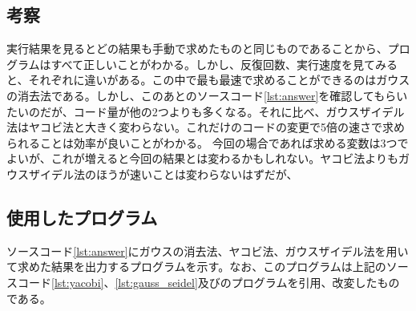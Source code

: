 \documentclass[12pt]{jsarticle}
\begin{document}
\subsection{考察}
実行結果を見るとどの結果も手動で求めたものと同じものであることから、プログラムはすべて正しいことがわかる。しかし、反復回数、実行速度を見てみると、それぞれに違いがある。この中で最も最速で求めることができるのはガウスの消去法である。しかし、このあとのソースコード\ref{lst:answer}を確認してもらいたいのだが、コード量が他の2つよりも多くなる。それに比べ、ガウスザイデル法はヤコビ法と大きく変わらない。これだけのコードの変更で5倍の速さで求められることは効率が良いことがわかる。
今回の場合であれば求める変数は3つでよいが、これが増えると今回の結果とは変わるかもしれない。ヤコビ法よりもガウスザイデル法のほうが速いことは変わらないはずだが、

\subsection{使用したプログラム}

ソースコード\ref{lst:answer}にガウスの消去法、ヤコビ法、ガウスザイデル法を用いて求めた結果を出力するプログラムを示す。なお、このプログラムは上記のソースコード\ref{lst:yacobi}、\ref{lst:gauss_seidel}及び\cite{gaussian}のプログラムを引用、改変したものである。
\end{document}
